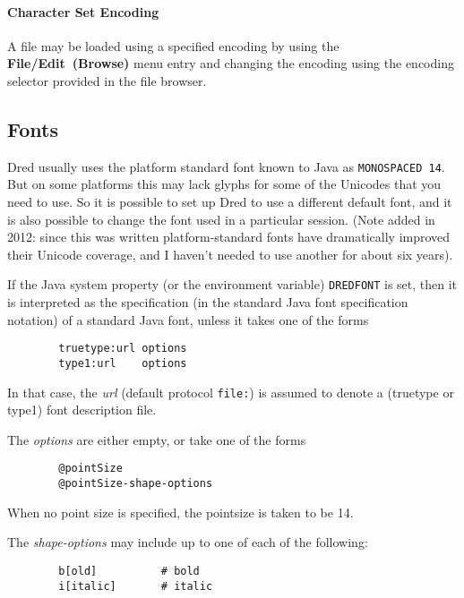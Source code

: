 \documentclass[
]{article}
\begin{document}
\hypertarget{character-set-encoding-1}{%
\paragraph{Character Set Encoding}\label{character-set-encoding-1}}

A file may be loaded using a specified encoding by using the
\textbf{File/Edit~(Browse)} menu entry and changing the encoding using
the encoding selector provided in the file browser.
\protect\hypertarget{Fonts}{}{}

\hypertarget{fonts}{%
\subsection{Fonts}\label{fonts}}

Dred usually uses the platform standard font known to Java as
\texttt{MONOSPACED\ 14}. But on some platforms this may lack glyphs for
some of the Unicodes that you need to use. So it is possible to set up
Dred to use a different default font, and it is also possible to change
the font used in a particular session. (Note added in 2012: since this
was written platform-standard fonts have dramatically improved their
Unicode coverage, and I haven't needed to use another for about six
years).

If the Java system property (or the environment variable)
\texttt{DREDFONT} is set, then it is interpreted as the specification
(in the standard Java font specification notation) of a standard Java
font, unless it takes one of the forms

\begin{verbatim}
        truetype:url options
        type1:url    options
\end{verbatim}

In that case, the \emph{url} (default protocol \texttt{file:}) is
assumed to denote a (truetype or type1) font description file.

The \emph{options} are either empty, or take one of the forms

\begin{verbatim}
        @pointSize
        @pointSize-shape-options
\end{verbatim}

When no point size is specified, the pointsize is taken to be 14.

The \emph{shape-options} may include up to one of each of the following:

\begin{verbatim}
        b[old]          # bold
        i[italic]       # italic
\end{verbatim}
\end{document}
